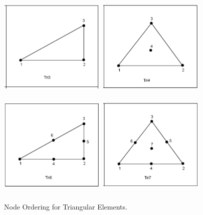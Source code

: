 \begin{figure}
\begin{center}
{\includegraphics[width=2.000in, height=2.000in]{topology/tri3.png}}
{\includegraphics[width=2.000in, height=2.000in]{topology/tri4.png}}
{\includegraphics[width=2.000in, height=2.000in]{topology/tri6.png}}
{\includegraphics[width=2.000in, height=2.000in]{topology/tri7.png}}
\caption{Node Ordering for Triangular Elements.}
\end{center}
\end{figure}


